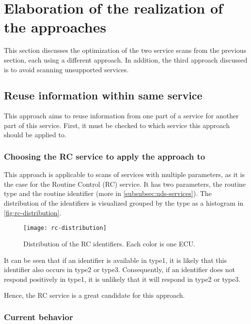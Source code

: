 \chapter{Elaboration of the realization of the approaches}

This section discusses the optimization of the two service scans from the previous section, each using a different approach. In addition, the third approach discussed is to avoid scanning unsupported services.

\section{Reuse information within same service}

This approach aims to reuse information from one part of a service for another part of this service. First, it must be checked to which service this approach should be applied to.

\subsection{Choosing the RC service to apply the approach to}

This approach is applicable to scans of services with multiple parameters, as it is the case for the Routine Control (RC) service. It has two parameters, the routine type and the routine identifier (more in \autoref{subsubsec:uds-services}). The distribution of the identifiers is visualized grouped by the type as a histogram in \autoref{fig:rc-distribution}.

\begin{figure}[htb]
    \centering
    \texttt{[image: rc-distribution]}
    \caption{Distribution of the RC identifiers. Each color is one ECU.}
    \label{fig:rc-distribution}
\end{figure}

It can be seen that if an identifier is available in type1, it is likely that this identifier also occurs in type2 or type3. Consequently, if an identifier does not respond positively in type1, it is unlikely that it will respond in type2 or type3.

Hence, the RC service is a great candidate for this approach.

\subsection{Current behavior}


